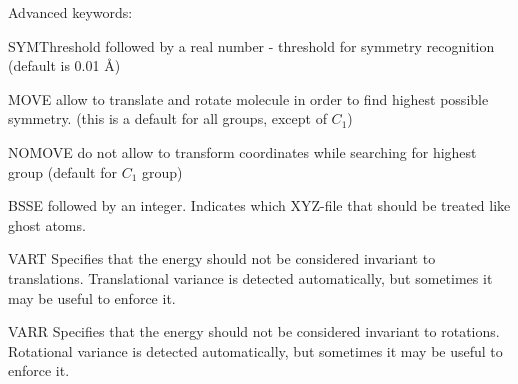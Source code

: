 Advanced keywords:
\begin{keywordlist}
\item[SYMThreshold]
followed by a real number - threshold for symmetry recognition (default is 0.01 \AA)

\item[MOVE]
allow to translate and rotate molecule in order to find highest possible symmetry.
(this is a default for all groups, except of $C_1$)
\item[NOMOVE]
do not allow to transform coordinates while searching for highest group (default for $C_1$ group)

\item[BSSE]
followed by an integer. Indicates which XYZ-file that should be
treated like ghost atoms.

\item[VART]
Specifies that the energy should not be considered invariant to translations.
Translational variance is detected automatically, but sometimes it may be useful to enforce it.

\item[VARR]
Specifies that the energy should not be considered invariant to rotations.
Rotational variance is detected automatically, but sometimes it may be useful to enforce it.


\end{keywordlist}
